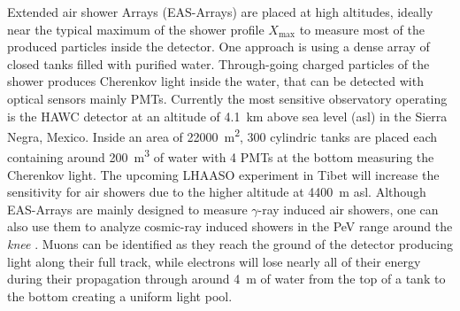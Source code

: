 Extended air shower Arrays (EAS-Arrays) are placed at high altitudes, ideally near the typical maximum of the shower profile $X_{\mathrm{max}}$ to measure most of the produced particles inside the detector.
One approach is using a dense array of closed tanks filled with purified water.
Through-going charged particles of the shower produces Cherenkov light inside the water, that can be detected with optical sensors mainly PMTs.
Currently the most sensitive observatory operating is the HAWC detector \cite{HAWC17} at an altitude of \SI{4.1}{km} above sea level (asl) in the Sierra Negra, Mexico.
Inside an area of \SI{22000}{\square\meter}, 300 cylindric tanks are placed each containing around \SI{200}{\cubic\meter} of water with 4 PMTs at the bottom measuring the Cherenkov light.
The upcoming LHAASO experiment in Tibet \cite{LHAASO19} will increase the sensitivity for air showers due to the higher altitude at \SI{4400}{m} asl.
Although EAS-Arrays are mainly designed to measure $\gamma$-ray induced air showers, one can also use them to analyze cosmic-ray induced showers in the PeV range around the \textit{knee} \cite{HAWC17CRSpectrum}.
Muons can be identified as they reach the ground of the detector producing light along their full track, while electrons will lose nearly all of their energy during their propagation through around \SI{4}{m} of water from the top of a tank to the bottom creating a uniform light pool.

